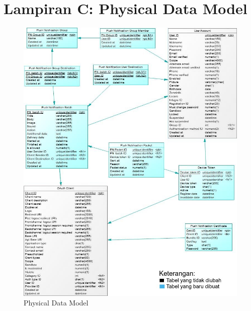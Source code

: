 \chapter{Lampiran C: Physical Data Model} \label{lampiran:pdm}
\begin{figure}[H]
	\centering\includegraphics[height=0.82\textheight]{penutup/lampiran/c/PDM_mix.jpg}
	\caption{Physical Data Model}
\end{figure}

